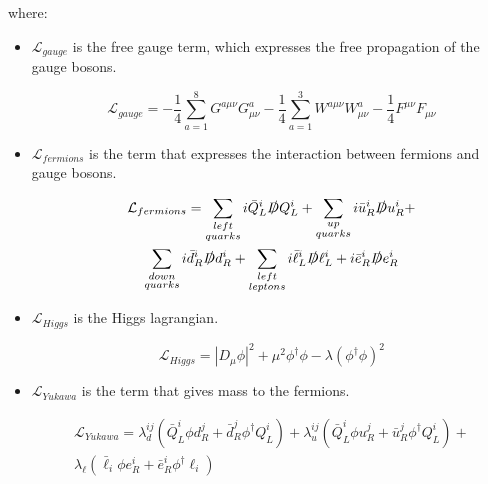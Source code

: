 where:

\begin{itemize}
    \item $\mathcal{L}_{gauge}$ is the free gauge term, which expresses the free propagation of the gauge bosons.
    
    \begin{equation}
        \mathcal{L}_{gauge} = - \frac{1}{4} \sum_{a=1}^8 G^{a \mu \nu} G^a_{\mu \nu} 
        - \frac{1}{4} \sum_{a=1}^3 W^{a \mu \nu} W^a_{\mu \nu} - \frac{1}{4} F^{\mu \nu} F_{\mu \nu}
    \end{equation}

    \item $\mathcal{L}_{fermions}$ is the term that expresses the interaction between fermions and gauge bosons.
    
    \begin{multline}
        \mathcal{L}_{fermions} = \sum_{\substack{left \\ quarks}} i \bar{Q}_L^i \slashed{D} Q_L^i +
        \sum_{\substack{up \\ quarks}} i \bar{u}_R^i \slashed{D} u_R^i + \\
        \sum_{\substack{down \\ quarks}} i \bar{d}_R^i \slashed{D} d_R^i +
        \sum_{\substack{left \\ leptons}} i \bar{\ell}_L^i \slashed{D} \ell_L^i + i \bar{e}_R^i \slashed{D} e_R^i 
    \end{multline}

    \item $\mathcal{L}_{Higgs}$ is the Higgs lagrangian.
    
    \begin{equation}
        \mathcal{L}_{Higgs} = |D_{\mu} \phi|^2 + \mu^2 \phi^{\dagger} \phi - \lambda (\phi^{\dagger} \phi)^2
    \end{equation}

    \item $\mathcal{L}_{Yukawa}$ is the term that gives mass to the fermions.
    
    \begin{multline}
        \mathcal{L}_{Yukawa} = \lambda^{ij}_d (\bar{Q}_L^i \phi d_R^j + \bar{d}_R^j \phi^{\dagger} Q_L^i) + 
        \lambda^{ij}_u (\bar{Q}_L^i \phi u_R^j + \bar{u}_R^j \phi^{\dagger} Q_L^i) + \\
        \lambda_{\ell}(\bar{\ell}_i \phi e^i_R + \bar{e}^i_R \phi^{\dagger} \ell_i)
    \end{multline}

\end{itemize}



